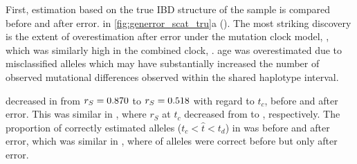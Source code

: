 %

%

First, estimation based on the true IBD structure of the sample is compared before and after error.
 in \cref{fig:generror_scat_tru}{a} ().
The most striking discovery is the extent of overestimation after error under the mutation clock model, \ClockM, which was similarly high in the combined clock, \ClockC.
 age was overestimated due to misclassified alleles which may have substantially increased the number of observed mutational differences observed within the shared haplotype interval.

 decreased in \ClockM from ${r_S = \dec{0.869553}}$ to ${r_S = \dec{0.517705}}$ with regard to $t_c$, before and after error.
This was similar in \ClockC, where $r_S$ at $t_c$ decreased from  to , respectively.
The proportion of correctly estimated alleles (${t_c < \hat{t} < t_d}$) in \ClockM was  before and
 after error, which was similar in \ClockC, where
 of alleles were correct before but only
 after error.


